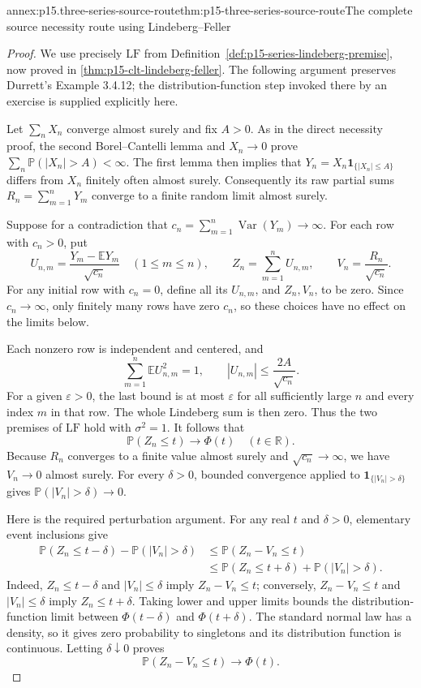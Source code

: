 \begin{annexitem}{annex:p15.three-series-source-route}{thm:p15-three-series-source-route}{The complete source necessity route using Lindeberg--Feller}
\begin{proof}
We use precisely \(\mathrm{LF}\) from
Definition~\ref{def:p15-series-lindeberg-premise}, now proved in
\cref{thm:p15-clt-lindeberg-feller}. The following
argument preserves Durrett's Example 3.4.12; the distribution-function
step invoked there by an exercise is supplied explicitly here.

Let \(\sum_nX_n\) converge almost surely and fix \(A>0\).
As in the direct necessity proof, the second Borel--Cantelli lemma
and \(X_n\to0\) prove
\(\sum_n\mathbb P(|X_n|>A)<\infty\). The first lemma then
implies that \(Y_n=X_n\mathbf1_{\{|X_n|\leq A\}}\) differs
from \(X_n\) finitely often almost surely. Consequently its raw
partial sums \(R_n=\sum_{m=1}^nY_m\) converge to a finite
random limit almost surely.

Suppose for a contradiction that
\(c_n=\sum_{m=1}^n\operatorname{Var}(Y_m)\to\infty\).
For each row with \(c_n>0\), put
\[
 U_{n,m}=\frac{Y_m-\mathbb EY_m}{\sqrt{c_n}}
       \quad(1\leq m\leq n),\qquad
 Z_n=\sum_{m=1}^nU_{n,m},\qquad
 V_n=\frac{R_n}{\sqrt{c_n}}.
\]
For any initial row with \(c_n=0\), define all its \(U_{n,m}\),
and \(Z_n,V_n\), to be zero. Since \(c_n\to\infty\), only
finitely many rows have zero \(c_n\), so these choices have no
effect on the limits below.

Each nonzero row is independent and centered, and
\[
 \sum_{m=1}^n\mathbb EU_{n,m}^2=1,\qquad
 |U_{n,m}|\leq\frac{2A}{\sqrt{c_n}}.
\]
For a given \(\varepsilon>0\), the last bound is at most
\(\varepsilon\) for all sufficiently large \(n\) and every
index \(m\) in that row. The whole Lindeberg sum is then zero.
Thus the two premises of \(\mathrm{LF}\) hold with \(\sigma^2=1\).
It follows that
\[
 \mathbb P(Z_n\leq t)\longrightarrow\Phi(t)
                              \quad(t\in\mathbb R).
\]
Because \(R_n\) converges to a finite value almost surely and
\(\sqrt{c_n}\to\infty\), we have \(V_n\to0\) almost surely.
For every \(\delta>0\), bounded convergence applied to
\(\mathbf1_{\{|V_n|>\delta\}}\) gives
\(\mathbb P(|V_n|>\delta)\to0\).

Here is the required perturbation argument. For any real \(t\)
and \(\delta>0\), elementary event inclusions give
\[
 \begin{aligned}
 \mathbb P(Z_n\leq t-\delta)-\mathbb P(|V_n|>\delta)
  &\leq\mathbb P(Z_n-V_n\leq t)\\
  &\leq\mathbb P(Z_n\leq t+\delta)
                           +\mathbb P(|V_n|>\delta).
 \end{aligned}
\]
Indeed, \(Z_n\leq t-\delta\) and \(|V_n|\leq\delta\)
imply \(Z_n-V_n\leq t\); conversely,
\(Z_n-V_n\leq t\) and \(|V_n|\leq\delta\) imply
\(Z_n\leq t+\delta\). Taking lower and upper limits bounds
the distribution-function limit between \(\Phi(t-\delta)\)
and \(\Phi(t+\delta)\). The standard normal law has a density,
so it gives zero probability to singletons and its distribution
function is continuous. Letting \(\delta\downarrow0\) proves
\[
 \mathbb P(Z_n-V_n\leq t)\longrightarrow\Phi(t).
\]


\end{proof}
\end{annexitem}
